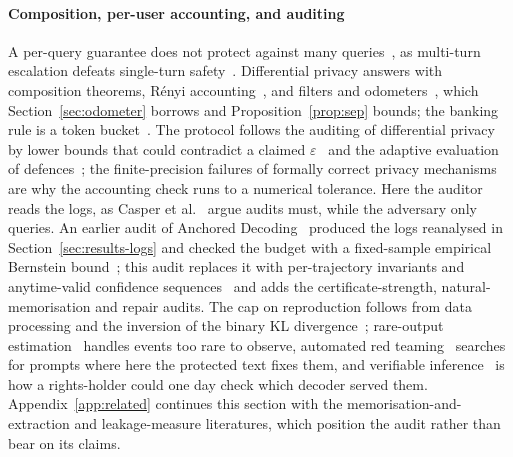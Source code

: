 \paragraph{Composition, per-user accounting, and auditing}
A per-query guarantee does not protect against many queries~\cite{dinur2003revealing,dwork2014algorithmic}, as multi-turn escalation defeats single-turn safety~\cite{russinovich2025crescendo}. Differential privacy answers with composition theorems, R\'enyi accounting~\cite{mironov2017renyi}, and filters and odometers~\cite{rogers2016odometers,whitehouse2023fully}, which Section~\ref{sec:odometer} borrows and Proposition~\ref{prop:sep} bounds; the banking rule is a token bucket~\cite{turner1986leaky}. The protocol follows the auditing of differential privacy by lower bounds that could contradict a claimed $\varepsilon$~\cite{jagielski2020auditing,nasr2023tight,steinke2023privacy,annamalai2024nearly,zanellabeguelin2023bayesian,pillutla2023unleashing,kong2023dpauditorium} and the adaptive evaluation of defences~\cite{athalye2018obfuscated,carlini2019evaluating,tramer2020adaptive}; the finite-precision failures of formally correct privacy mechanisms~\cite{mironov2012significance,casacuberta2022widespread} are why the accounting check runs to a numerical tolerance. Here the auditor reads the logs, as Casper et al.~\cite{casper2024blackbox} argue audits must, while the adversary only queries. An earlier audit of Anchored Decoding~\cite{vijayavallabh2026audit} produced the logs reanalysed in Section~\ref{sec:results-logs} and checked the budget with a fixed-sample empirical Bernstein bound~\cite{maurer2009empirical,mnih2008empirical}; this audit replaces it with per-trajectory invariants and anytime-valid confidence sequences~\cite{howard2021timeuniform,waudbysmith2024estimating,chugg2025closedform,chugg2023auditing,zhou2026adaptive} and adds the certificate-strength, natural-memorisation and repair audits. The cap on reproduction follows from data processing and the inversion of the binary KL divergence~\cite{polyanskiy2024information,tsybakov2009introduction,bretagnolle1979estimation}; rare-output estimation~\cite{wu2025rare} handles events too rare to observe, automated red teaming~\cite{perez2022redteaming,ganguli2022redteaming,mouret2015mapelites,samvelyan2024rainbow} searches for prompts where here the protected text fixes them, and verifiable inference~\cite{sun2024zkllm} is how a rights-holder could one day check which decoder served them.
Appendix~\ref{app:related} continues this section with the memorisation-and-extraction and leakage-measure literatures, which position the audit rather than bear on its claims.
